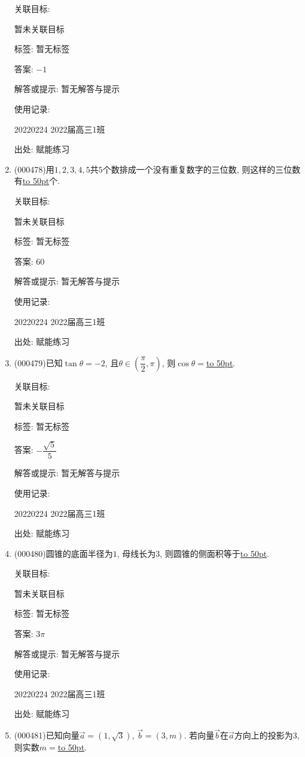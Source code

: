 \documentclass[10pt,a4paper]{article}
\newcommand{\blank}[1]{\underline{\hbox to #1pt{}}}
\begin{document}
\begin{enumerate}[1.]
关联目标:

暂未关联目标



标签: 暂无标签

答案: $-1$

解答或提示: 暂无解答与提示

使用记录:

20220224	2022届高三1班	


出处: 赋能练习
\item { (000478)}用$1,2,3,4,5$共$5$个数排成一个没有重复数字的三位数, 则这样的三位数有\blank{50}个.


关联目标:

暂未关联目标



标签: 暂无标签

答案: $60$

解答或提示: 暂无解答与提示

使用记录:

20220224	2022届高三1班	


出处: 赋能练习
\item { (000479)}已知$\tan \theta =-2$, 且$\theta \in (\dfrac\pi 2,\pi)$, 则$\cos\theta=$\blank{50}.


关联目标:

暂未关联目标



标签: 暂无标签

答案: $-\dfrac{\sqrt 5}5$

解答或提示: 暂无解答与提示

使用记录:

20220224	2022届高三1班	


出处: 赋能练习
\item { (000480)}圆锥的底面半径为$1$, 母线长为$3$, 则圆锥的侧面积等于\blank{50}.


关联目标:

暂未关联目标



标签: 暂无标签

答案: $3\pi$

解答或提示: 暂无解答与提示

使用记录:

20220224	2022届高三1班	


出处: 赋能练习
\item { (000481)}已知向量$\overrightarrow{a}=(1,\sqrt{3})$, $\overrightarrow{b}=(3,m)$. 若向量$\overrightarrow{b}$在$\overrightarrow{a}$方向上的投影为$3$, 则实数$m=$\blank{50}.



\end{enumerate}
\end{document}
